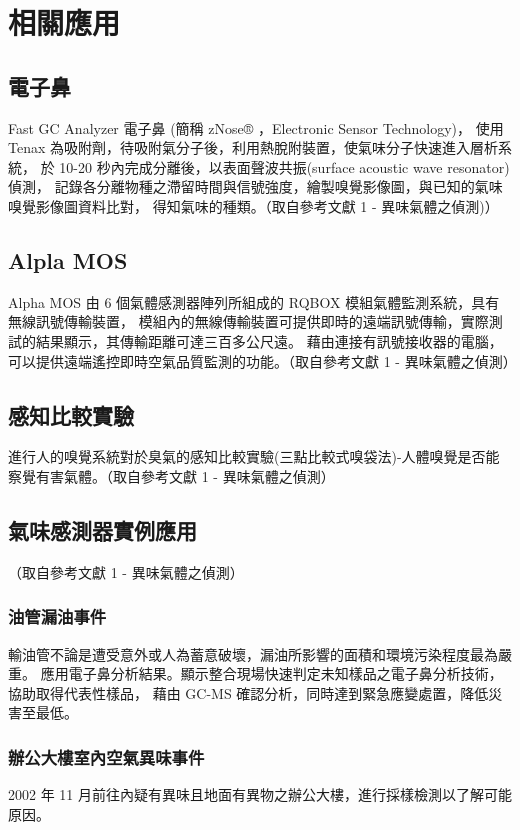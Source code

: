 \chapter{相關應用}

\section{電子鼻}
Fast GC Analyzer 電子鼻 (簡稱 zNose® ，Electronic Sensor Technology)，
使用 Tenax 為吸附劑，待吸附氣分子後，利用熱脫附裝置，使氣味分子快速進入層析系統，
於 10-20 秒內完成分離後，以表面聲波共振(surface acoustic wave resonator) 偵測，
記錄各分離物種之滯留時間與信號強度，繪製嗅覺影像圖，與已知的氣味嗅覺影像圖資料比對，
得知氣味的種類。（取自參考文獻 1 - 異味氣體之偵測)）

\section{Alpla MOS}
Alpha MOS 由 6 個氣體感測器陣列所組成的 RQBOX 模組氣體監測系統，具有無線訊號傳輸裝置，
模組內的無線傳輸裝置可提供即時的遠端訊號傳輸，實際測試的結果顯示，其傳輸距離可達三百多公尺遠。
藉由連接有訊號接收器的電腦，可以提供遠端遙控即時空氣品質監測的功能。（取自參考文獻 1 - 異味氣體之偵測）

\section{感知比較實驗}
進行人的嗅覺系統對於臭氣的感知比較實驗(三點比較式嗅袋法)-人體嗅覺是否能察覺有害氣體。（取自參考文獻 1 - 異味氣體之偵測）

\section{氣味感測器實例應用}
（取自參考文獻 1 - 異味氣體之偵測）\\
	\subsection{油管漏油事件}
	輸油管不論是遭受意外或人為蓄意破壞，漏油所影響的面積和環境污染程度最為嚴重。
	應用電子鼻分析結果。顯示整合現場快速判定未知樣品之電子鼻分析技術，協助取得代表性樣品，
	藉由 GC-MS 確認分析，同時達到緊急應變處置，降低災害至最低。
	\subsection{辦公大樓室內空氣異味事件}
	2002 年 11 月前往內疑有異味且地面有異物之辦公大樓，進行採樣檢測以了解可能原因。
